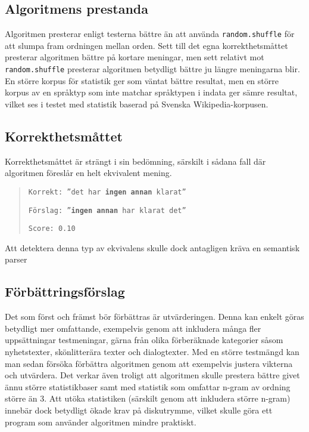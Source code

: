 \documentclass[a4paper,11pt]{article}
\begin{document}
\subsection*{Algoritmens prestanda}
Algoritmen presterar enligt testerna bättre än att använda \texttt{random.shuffle} för att slumpa fram
ordningen mellan orden. Sett till det egna korrekthetsmåttet presterar algoritmen bättre på
kortare meningar, men sett relativt mot \texttt{random.shuffle} presterar algoritmen betydligt
bättre ju längre meningarna blir. En större korpus för statistik ger som väntat bättre resultat, men
en större korpus av en språktyp som inte matchar språktypen i indata ger sämre resultat, vilket
ses i testet med statistik baserad på Svenska Wikipedia-korpusen.

\subsection*{Korrekthetsmåttet}
Korrekthetsmåttet är strängt i sin bedömning, särskilt i sådana fall där
algoritmen föreslår en helt ekvivalent mening.

\begin{quote}
\texttt{Korrekt: ''det har \textbf{ingen annan} klarat''}

\texttt{Förslag: ''\textbf{ingen annan} har klarat det''}

\texttt{Score: 0.10}
\end{quote}

\vspace{0.25cm}
\noindent
Att detektera denna typ av ekvivalens skulle dock antagligen kräva en semantisk parser

\subsection*{Förbättringsförslag}
Det som först och främst bör förbättras är utvärderingen. Denna kan enkelt göras betydligt
mer omfattande, exempelvis genom att inkludera många fler uppsättningar testmeningar,
gärna från olika förberäknade kategorier såsom nyhetstexter, skönlitterära texter och
dialogtexter. Med en större testmängd kan man sedan försöka förbättra algoritmen
genom att exempelvis justera vikterna och utvärdera. Det verkar även troligt att 
algoritmen skulle prestera bättre givet ännu större statistikbaser samt med statistik
som omfattar n-gram av ordning större än 3. Att utöka statistiken (särskilt genom att
inkludera större n-gram) innebär dock betydligt ökade krav på diskutrymme, vilket
skulle göra ett program som använder algoritmen mindre praktiskt.
\end{document}
